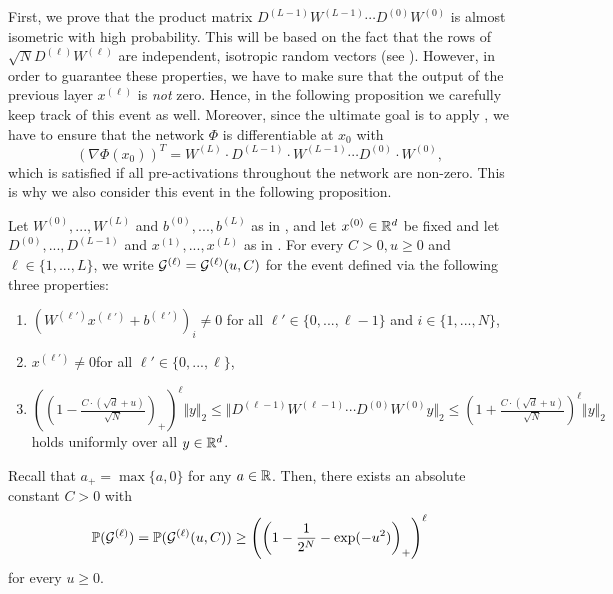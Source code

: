 First, we prove that the product matrix $D^{(L-1)} W^{(L-1)} \cdots D^{(0)} W^{(0)}$ is almost isometric with high probability. 
This will be based on the fact that the rows of $\sqrt{N}D^{(\ell)}W^{(\ell)}$ are independent, isotropic random vectors (see ). 
However, in order to guarantee these properties, we have to make sure that the output of the previous layer $x^{(\ell)}$ is \emph{not} zero. 
Hence, in the following proposition we carefully keep track of this event as well. 
Moreover, since the ultimate goal is to apply , we have to ensure that the network $\Phi$ is differentiable at $x_0$ with
\begin{equation*}
\left(\nabla \Phi(x_0)\right)^T = W^{(L)}\cdot  D^{(L-1)} \cdot W^{(L-1)}\cdots D^{(0)} \cdot W^{(0)},
\end{equation*}
which is satisfied if all pre-activations throughout the network are non-zero. This is why we also consider this event in the following proposition.
\begin{proposition}\label{prop:gell}
Let $W^{(0)},..., W^{(L)}$ and $b^{(0)},..., b^{(L)}$ as in , and let $x^{(0)} \in \mathbb{R}^d$ be fixed and let $D^{(0)},..., D^{(L-1)}$ and $x^{(1)},..., x^{(L)}$ as in . For every $C>0, u \geq 0$ and $\ell \in \{1,...,L\}$, we write $\mathcal{G}^{(\ell)} = \mathcal{G}^{(\ell)}(u, C)$ for the event defined via the following three properties:
\begin{enumerate}
\item $(W^{(\ell')}x^{(\ell')} + b^{(\ell')})_i \neq 0$ \quad  for all $\ell' \in \{0,..., \ell-1\}$ and $i \in \{1,...,N\}$,
\item $x^{(\ell')} \neq 0$\quad for all $\ell' \in \{0,..., \ell\}$,
\item $\displaystyle \left(\left(1 - \frac{C \!\cdot\! (\sqrt{d} + u)}{\sqrt{N}}\right)_+\right) ^{\ell}\Vert y \Vert_2 \leq \Vert D^{(\ell-1)}W^{(\ell-1)}\cdots D^{(0)}W^{(0)}y \Vert_2 \leq \left( 1+ \frac{C \!\cdot \!(\sqrt{d} + u)}{\sqrt{N}}\right)^\ell \Vert y \Vert_2 $ holds uniformly over all $y \in \mathbb{R}^d$.
\end{enumerate}
Recall that $a_+ = \max\{a,0\}$ for any $a \in \mathbb{R}$.
Then, there exists an absolute constant $C>0$ with 
\begin{equation*}
\mathbb{P} (\mathcal{G}^{(\ell)} ) = \mathbb{P} (\mathcal{G}^{(\ell)}(u,C) )\geq \left(\left(1 - \frac{1}{2^N} - \exp(-u^2)\right)_+\right)^\ell
\end{equation*} 
for every $u \geq 0$.
\end{proposition}
